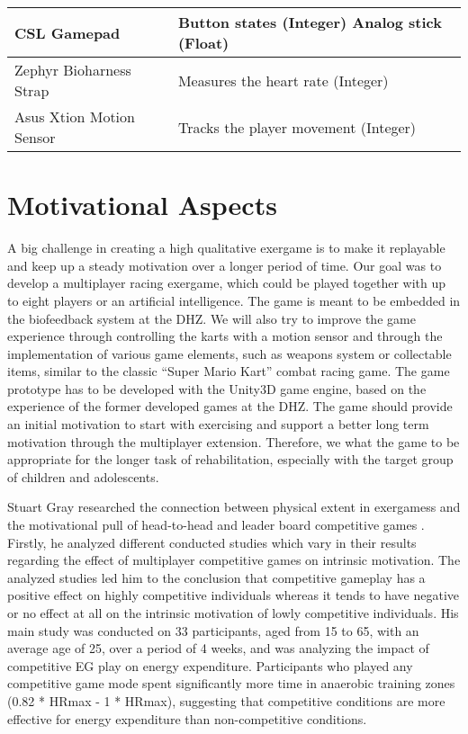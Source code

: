 \begin{multicols}{2}
\begin{center}
\begin{tabular}{ | C{2cm}  | C{4.25cm} | }
    CSL Gamepad & Button states (Integer) Analog stick (Float) \\ \hline
    
    Zephyr Bioharness Strap & Measures the heart rate (Integer) \\ \hline

    Asus Xtion Motion Sensor & Tracks the player movement (Integer) \\ \hline
    
    \end{tabular}
\end{center}


\section{Motivational Aspects}

A big challenge in creating a high qualitative exergame is to make it replayable and keep up a steady motivation over a longer period of time. Our goal was to develop a multiplayer racing exergame, which could be played together with up to eight players or an artificial intelligence. The game is meant to be embedded in the biofeedback system at the DHZ. We will also try to improve the game experience through controlling the karts with a motion sensor and through the implementation of various game elements, such as weapons system or collectable items, similar to the classic “Super Mario Kart” \cite{NitendoWiiMario} combat racing game. The game prototype has to be developed with the Unity3D game engine, based on the experience of the former developed games at the DHZ. The game should provide an initial motivation to start with exercising and support a better long term motivation through the multiplayer extension. Therefore, we what the game to be appropriate for the longer task of rehabilitation, especially with the target group of children and adolescents. 

Stuart Gray researched the connection between physical extent in exergamess and the motivational pull of head-to-head and leader board competitive games \cite{Gray2013}. Firstly, he analyzed different conducted studies which vary in their results regarding the effect of multiplayer competitive games on intrinsic motivation. The analyzed studies led him to the conclusion that competitive gameplay has a positive effect on highly competitive individuals whereas it tends to have negative or no effect at all on the intrinsic motivation of lowly competitive individuals. His main study was conducted on 33 participants, aged from 15 to 65, with an average age of 25, over a period of 4 weeks, and was analyzing the impact of competitive EG play on energy expenditure. Participants who played any competitive game mode spent significantly more time in anaerobic training zones (0.82 * HRmax - 1 * HRmax), suggesting that competitive conditions are more effective for energy expenditure than non-competitive conditions.



\end{multicols}
